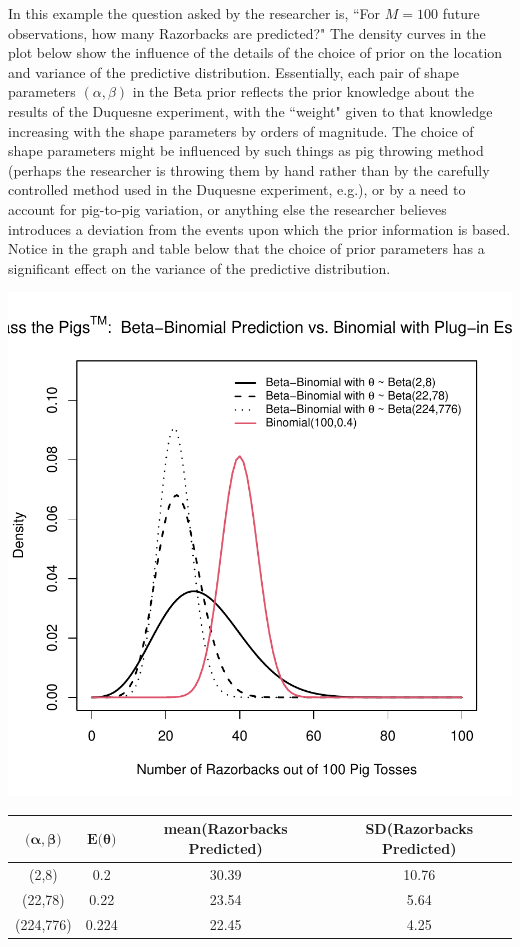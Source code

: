 \documentclass[12pt, a4paper]{article}
\begin{document}
  In this example the question asked by the researcher is, ``For $M = 100$ future observations, how many Razorbacks are predicted?"  The density curves in the plot below show the influence of the details of the choice of prior on the location and variance of the predictive distribution.  Essentially, each pair of shape parameters $(\alpha,\beta)$ in the Beta prior reflects the prior knowledge about the results of the Duquesne experiment, with the ``weight" given to that knowledge increasing with the shape parameters by orders of magnitude.  The choice of shape parameters might be influenced by such things as pig throwing method (perhaps the researcher is throwing them by hand rather than by the carefully controlled method used in the Duquesne experiment, e.g.), or by a need to account for pig-to-pig variation, or anything else the researcher believes introduces a deviation from the events upon which the prior information is based.  Notice in the graph and table below that the choice of prior parameters has a significant effect on the variance of the predictive distribution.


\includegraphics{Thesis_v1-002}


\begin{center}
  \begin{tabular}{ |c|c|c|c| }
     \hline
     $\textbf{(}\boldsymbol\alpha,\boldsymbol\beta\textbf{)}$ & $\textbf{E(}\boldsymbol\theta\textbf{)}$ & \textbf{mean(Razorbacks Predicted)} & \textbf{SD(Razorbacks Predicted)} \\
     \hline
     (2,8) & 0.2 & 30.39 & 10.76 \\
     \hline
     (22,78) & 0.22 & 23.54 & 5.64 \\
     \hline
     (224,776) & 0.224 & 22.45 & 4.25 \\
     \hline
  \end{tabular}
\end{center}
\end{document}
